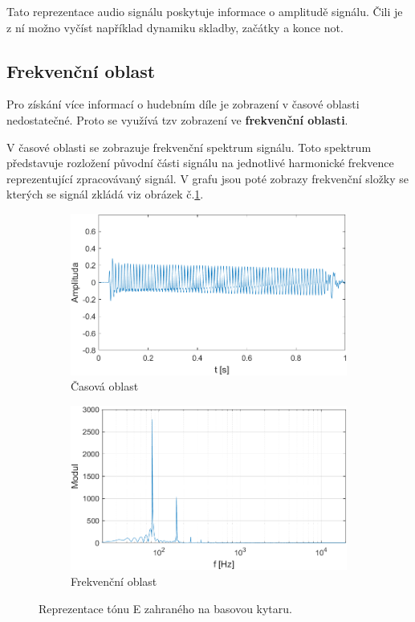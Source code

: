   Tato reprezentace audio signálu poskytuje informace o amplitudě signálu. Čili je z ní možno vyčíst například dynamiku skladby, začátky a konce not.
  
  \subsection{Frekvenční oblast}
  Pro získání více informací o hudebním díle je zobrazení v časové oblasti nedostatečné.
  Proto se využívá tzv zobrazení ve \textbf{frekvenční oblasti}.

  V časové oblasti se zobrazuje frekvenční spektrum signálu.
  Toto spektrum představuje rozložení původní části signálu na jednotlivé harmonické frekvence reprezentující zpracovávaný signál.
  V grafu jsou poté zobrazy frekvenční složky se kterých se signál zkládá viz obrázek č.\ref*{fig:Bass_tone}.

  \begin{figure}[H]
    \centering
    \begin{subfigure}[b]{0.8\linewidth}
        \includegraphics[width = \linewidth]{obrazky/Bass_tone_waveform.png}
        \caption{Časová oblast}
    \end{subfigure}
    \begin{subfigure}[b]{0.8\linewidth}
        \includegraphics[width = \linewidth]{obrazky/Bass_tone_spectrum.png}
        \caption{Frekvenční oblast}
    \end{subfigure}
    \caption{Reprezentace tónu E zahraného na basovou kytaru.}
    \label{fig:Bass_tone}
\end{figure}
  
